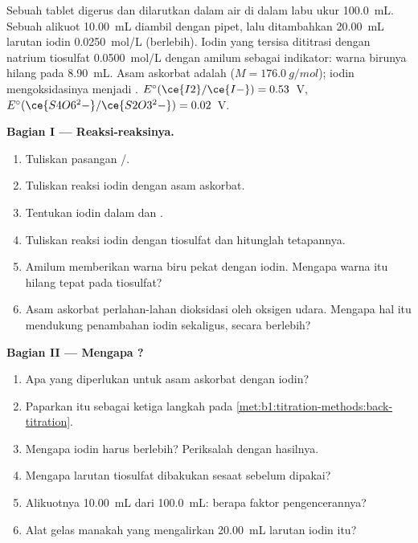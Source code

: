 \begin{problem}
\label{pb:b1:titration-methods:1}
Sebuah tablet digerus dan dilarutkan dalam air di dalam labu ukur
\qty{100.0}{mL}. Sebuah alikuot \qty{10.00}{mL} diambil dengan pipet, lalu
ditambahkan \qty{20.00}{mL} larutan iodin \qty{0.0250}{mol/L} (berlebih).
Iodin yang tersisa dititrasi dengan natrium tiosulfat \qty{0.0500}{mol/L}
dengan amilum sebagai indikator: warna birunya hilang pada
\qty{8.90}{mL}. Asam askorbat adalah  ($M = \qty{176.0}{g/mol}$);
iodin mengoksidasinya menjadi . $E^\circ(\ce{I2}/\ce{I-}) = 0.53$~V,
$E^\circ(\ce{S4O6^2-}/\ce{S2O3^2-}) = 0.02$~V.

\medskip
\noindent\textbf{Bagian I --- Reaksi-reaksinya.}
\begin{enumerate}
  \item Tuliskan  pasangan /.
  \item Tuliskan reaksi iodin dengan asam askorbat.
  \item Tentukan  iodin dalam  dan .
  \item Tuliskan reaksi iodin dengan tiosulfat dan hitunglah tetapannya.
  \item Amilum memberikan warna biru pekat dengan iodin. Mengapa warna itu
        hilang tepat pada   tiosulfat?
  \item Asam askorbat perlahan-lahan dioksidasi oleh oksigen udara.
        Mengapa hal itu mendukung penambahan iodin sekaligus, secara
        berlebih?
\end{enumerate}

\medskip
\noindent\textbf{Bagian II --- Mengapa ?}
\begin{enumerate}[resume]
  \item Apa yang diperlukan untuk  asam askorbat dengan
        iodin?
  \item Paparkan  itu sebagai ketiga langkah pada
        \cref{met:b1:titration-methods:back-titration}.
  \item Mengapa iodin harus berlebih? Periksalah dengan hasilnya.
  \item Mengapa larutan tiosulfat dibakukan sesaat sebelum dipakai?
  \item Alikuotnya \qty{10.00}{mL} dari \qty{100.0}{mL}: berapa faktor
        pengencerannya?
  \item Alat gelas manakah yang mengalirkan \qty{20.00}{mL} larutan iodin
        itu?
\end{enumerate}


\end{problem}

